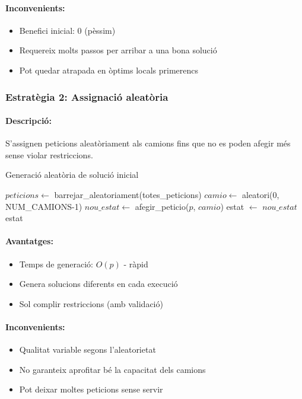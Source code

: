 \paragraph{Inconvenients:}
\begin{itemize}
    \item Benefici inicial: 0 (pèssim)
    \item Requereix molts passos per arribar a una bona solució
    \item Pot quedar atrapada en òptims locals primerencs
\end{itemize}

\subsubsection{Estratègia 2: Assignació aleatòria}

\paragraph{Descripció:}
S'assignen peticions aleatòriament als camions fins que no es poden afegir més sense violar restriccions.

\begin{algorithm}[H]
\caption{Generació aleatòria de solució inicial}
\begin{algorithmic}[1]
\State $peticions \gets$ barrejar\_aleatoriament(totes\_peticions)
    \State $camio \gets$ aleatori(0, NUM\_CAMIONS-1)
    \State $nou\_estat \gets$ afegir\_peticio($p$, $camio$)
        \State estat $\gets$ $nou\_estat$
    \EndIf
\EndFor
\State \Return estat
\end{algorithmic}
\end{algorithm}

\paragraph{Avantatges:}
\begin{itemize}
    \item Temps de generació: $O(p)$ - ràpid
    \item Genera solucions diferents en cada execució
    \item Sol complir restriccions (amb validació)
\end{itemize}

\paragraph{Inconvenients:}
\begin{itemize}
    \item Qualitat variable segons l'aleatorietat
    \item No garanteix aprofitar bé la capacitat dels camions
    \item Pot deixar moltes peticions sense servir
\end{itemize}

